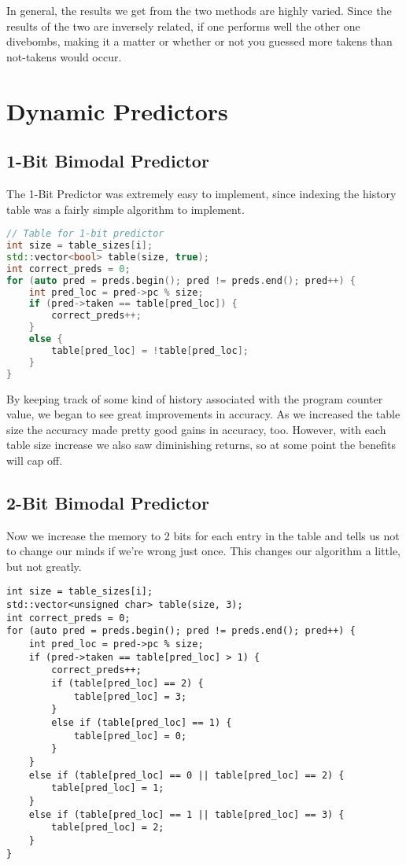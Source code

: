 \documentclass[12pt]{article}
\begin{document}
In general, the results we get from the two methods are highly varied. Since the
results of the two are inversely related, if one performs well the other one
divebombs, making it a matter or whether or not you guessed more takens than
not-takens would occur.

\section{Dynamic Predictors}

\label{sec:label}

\subsection{1-Bit Bimodal Predictor}
\label{subsec:label}

The 1-Bit Predictor was extremely easy to implement, since indexing the history
table was a fairly simple algorithm to implement.

\begin{lstlisting}[language=C++, caption=Giving our predictor a brain]
// Table for 1-bit predictor
int size = table_sizes[i];
std::vector<bool> table(size, true);
int correct_preds = 0;
for (auto pred = preds.begin(); pred != preds.end(); pred++) {
    int pred_loc = pred->pc % size;
    if (pred->taken == table[pred_loc]) {
        correct_preds++;
    }
    else {
        table[pred_loc] = !table[pred_loc];
    }
}
\end{lstlisting}

By keeping track of some kind of history associated with the program counter
value, we began to see great improvements in accuracy. As we increased the table
size the accuracy made pretty good gains in accuracy, too. However, with each
table size increase we also saw diminishing returns, so at some point the
benefits will cap off.

\subsection{2-Bit Bimodal Predictor}
\label{subsec:label}

Now we increase the memory to 2 bits for each entry in the table and tells us
not to change our minds if we're wrong just once. This changes
our algorithm a little, but not greatly.

\begin{lstlisting}[languag=C++, caption=A few more conditions, but the same idea]
int size = table_sizes[i];
std::vector<unsigned char> table(size, 3);
int correct_preds = 0;
for (auto pred = preds.begin(); pred != preds.end(); pred++) {
    int pred_loc = pred->pc % size;
    if (pred->taken == table[pred_loc] > 1) {
        correct_preds++;
        if (table[pred_loc] == 2) {
            table[pred_loc] = 3;
        }
        else if (table[pred_loc] == 1) {
            table[pred_loc] = 0;
        }
    }
    else if (table[pred_loc] == 0 || table[pred_loc] == 2) {
        table[pred_loc] = 1;
    }
    else if (table[pred_loc] == 1 || table[pred_loc] == 3) {
        table[pred_loc] = 2;
    }
}
\end{lstlisting}
\end{document}
